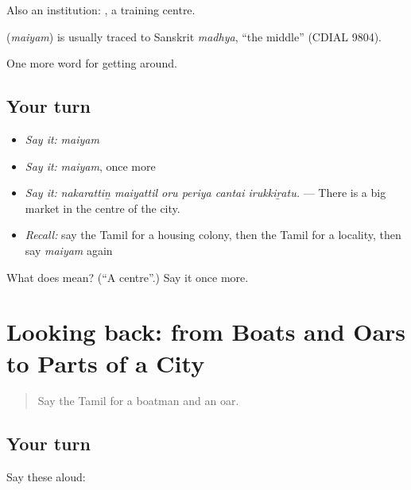 Also an institution:  , a training centre.

\begin{cousinweb}
\textbf{} (\emph{maiyam}) is usually traced to Sanskrit \emph{madhya}, \textquotedblleft{}the middle\textquotedblright{} (CDIAL 9804).
\end{cousinweb}

\begin{grammarlens}[title={What you've built}]
One more word for getting around.
\end{grammarlens}

\subsection*{Your turn}
\begin{itemize}
\raggedright
  \item \emph{Say it:} \emph{maiyam}
  \item \emph{Say it:} \emph{maiyam}, once more
  \item \emph{Say it:} \emph{nakarattiṉ maiyattil oru periya cantai irukkiṟatu.} — There is a big market in the centre of the city.
  \item \emph{Recall:} say the Tamil for a housing colony, then the Tamil for a locality, then say \emph{maiyam} again
\end{itemize}

\begin{tcolorbox}[breakable,colback=teal!4,colframe=teal!35!black,title={Before you move on}]
What does  mean? (\textquotedblleft{}A centre\textquotedblright{}.) Say it once more.
\end{tcolorbox}
\section[(dialogue)]{Looking back: from Boats and Oars to Parts of a City}

\label{lesson:TA-R423-review-416-423}



\begin{quote}
Say the Tamil for a boatman and an oar.
\end{quote}

\subsection*{Your turn}
Say these aloud:

